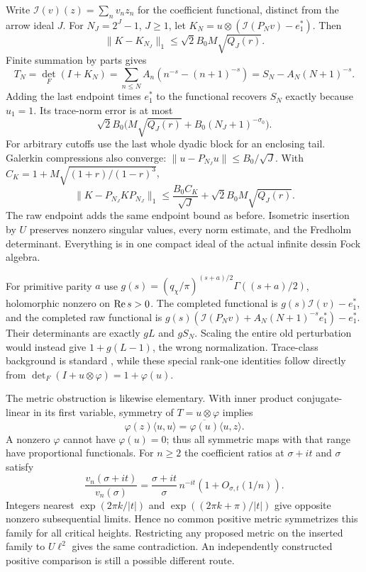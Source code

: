 Write $\mathcal I(v)(z)=\sum_n v_nz_n$ for the coefficient functional, distinct from the arrow ideal $J$. For $N_J=2^J-1$, $J\ge1$, let $K_N=u\otimes(\mathcal I(P_Nv)-e_1^*)$. Then
\[
 \|K-K_{N_J}\|_1\le\sqrt2 B_0M\sqrt{Q_J(r)}.
\]
Finite summation by parts gives
\[
 T_N=\det_F(I+K_N)
 =\sum_{n\le N}A_n(n^{-s}-(n+1)^{-s})
 =S_N-A_N(N+1)^{-s}.
\]
Adding the last endpoint times $e_1^*$ to the functional recovers $S_N$ exactly because $u_1=1$. Its trace-norm error is at most
\[
 \sqrt2 B_0\bigl(M\sqrt{Q_J(r)}+B_0(N_J+1)^{-\sigma_0}\bigr).
\]
For arbitrary cutoffs use the last whole dyadic block for an enclosing tail. Galerkin compressions also converge: $\|u-P_{N_J}u\|\le B_0/\sqrt J$. With $C_K=1+M\sqrt{(1+r)/(1-r)^3}$,
\[
 \|K-P_{N_J}KP_{N_J}\|_1
 \le\frac{B_0 C_K}{\sqrt J}+\sqrt2 B_0M\sqrt{Q_J(r)}.
\]
The raw endpoint adds the same endpoint bound as before. Isometric insertion by $U$ preserves nonzero singular values, every norm estimate, and the Fredholm determinant. Everything is in one compact ideal of the actual infinite dessin Fock algebra.

For primitive parity $a$ use $g(s)=(q_\chi/\pi)^{(s+a)/2}\Gamma((s+a)/2)$, holomorphic nonzero on $\operatorname{Re} s>0$. The completed functional is $g(s)\mathcal I(v)-e_1^*$, and the completed raw functional is $g(s)(\mathcal I(P_Nv)+A_N(N+1)^{-s}e_1^*)-e_1^*$. Their determinants are exactly $gL$ and $gS_N$. Scaling the entire old perturbation would instead give $1+g(L-1)$, the wrong normalization. Trace-class background is standard \cite{Bornemann}, while these special rank-one identities follow directly from $\det_F(I+u\otimes\varphi)=1+\varphi(u)$.

The metric obstruction is likewise elementary. With inner product conjugate-linear in its first variable, symmetry of $T=u\otimes\varphi$ implies
\[
 \varphi(z)\langle u,u\rangle=\overline{\varphi(u)}\langle u,z\rangle.
\]
A nonzero $\varphi$ cannot have $\varphi(u)=0$; thus all symmetric maps with that range have proportional functionals. For $n\ge2$ the coefficient ratios at $\sigma+it$ and $\sigma$ satisfy
\[
 \frac{v_n(\sigma+it)}{v_n(\sigma)}
 =\frac{\sigma+it}{\sigma}\,n^{-it}(1+O_{\sigma,t}(1/n)).
\]
Integers nearest $\exp(2\pi k/|t|)$ and $\exp((2\pi k+\pi)/|t|)$ give opposite nonzero subsequential limits. Hence no common positive metric symmetrizes this family for all critical heights. Restricting any proposed metric on the inserted family to $U\ell^2$ gives the same contradiction. An independently constructed positive comparison is still a possible different route.

